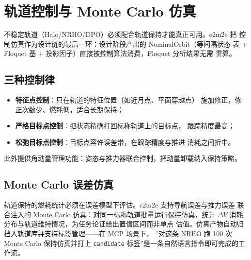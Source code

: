 \section{轨道控制与 Monte Carlo 仿真}
\label{sec:control}

不稳定轨道（Halo/NRHO/DPO）必须配合轨道保持才能真正可用。e2m2e 把
控制仿真作为设计链的最后一环：设计阶段产出的 NominalOrbit（等间隔状态
表 + Floquet 基 + 投影因子）直接被控制算法消费，Floquet 分析结果无需
重算。

\subsection{三种控制律}

\begin{itemize}
  \item \textbf{特征点控制}：只在轨道的特征位置（如近月点、平面穿越点）
        施加修正，修正次数少、燃耗低，适合长期保持；
  \item \textbf{严格目标点控制}：把状态精确打回标称轨道上的目标点，
        跟踪精度最高；
  \item \textbf{松弛目标点控制}：目标点容许误差带，在跟踪精度与推进
        消耗之间折中。
\end{itemize}

此外提供角动量管理功能：姿态与推力器联合控制，把动量卸载纳入保持策略。

\subsection{Monte Carlo 误差仿真}

轨道保持的燃耗统计必须在误差模型下评估。e2m2e 支持导航误差与推力误差
联合注入的 Monte Carlo 仿真：对同一标称轨道批量运行保持仿真，统计
$\Delta V$ 消耗分布与轨道维持情况，为任务论证给出置信区间而非单点
估值。仿真产物自动归档入轨道库并支持标签管理——在 MCP 场景下，
“对这条 NRHO 跑 100 次 Monte Carlo 保持仿真并打上
\texttt{candidate} 标签”是一条自然语言指令即可完成的工作流。
